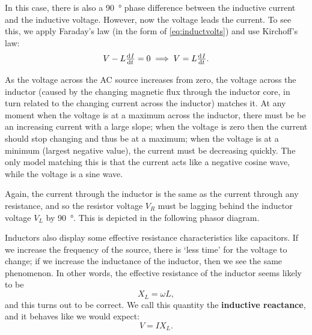 \documentclass[a4paper]{amsbook}
\newcommand{\marginsymbol}{}
\newcommand{\expphasordeg}[4]%
{   \path (#1);
  \pgfgetlastxy{\xorig}{\yorig}
  \pgfmathsetmacro{\xfirst}{\xorig/28.453}
  \pgfmathsetmacro{\yfirst}{\yorig/28.453}
  \pgfmathsetmacro{\xsecond}{\xorig/28.453+#2*cos(#3)}
  \pgfmathsetmacro{\ysecond}{\yorig/28.453+#2*sin(#3)}
  \draw[#4] (\xfirst,\yfirst) -- (\xsecond,\ysecond);
}
\theoremstyle{definition}
\numberwithin{exercise}{chapter}
\numberwithin{exercise}{chapter}
\begin{document}
In this case, there is also a \SI{90}{\degree} phase difference between the inductive current and the inductive voltage. However,
now the voltage leads the current. To see this, we apply Faraday's law (in the form of \cref{eq:inductvolts}) and use
Kirchoff's law:
\begin{displaymath}
  V - L \od{I}{t} = 0 \implies V = L \od{I}{t}.
\end{displaymath}

\marginsymbol As the voltage across the AC source increases from zero, the voltage across the inductor (caused by the changing magnetic flux through
the inductor core, in turn related to the changing current across the inductor) matches it. At any moment when the voltage is at a maximum
across the inductor, there must be be an increasing current with a large slope; when the voltage is zero then the current should stop changing
and thus be at a maximum; when the voltage is at a minimum (largest negative value), the current must be decreasing quickly. The only model
matching this is that the current acts like a negative cosine wave, while the voltage is a sine wave.

Again, the current through the inductor is the same as the current through any resistance, and so the resistor voltage $ V_R $ must be lagging
behind the inductor voltage $ V_L $ by \SI{90}{\degree}. This is depicted in the following phasor diagram.
\begin{center}
\end{center}

Inductors also display some effective resistance characteristics like capacitors. If we increase the frequency of the source, there is `less
time' for the voltage to change; if we increase the inductance of the inductor, then we see the same phenomenon. In other words, the effective
resistance of the inductor seems likely to be
\begin{equation}
  X_L = \omega L,
\end{equation}
and this turns out to be correct. We call this quantity the \textbf{inductive reactance}, and it behaves like we would expect:
\begin{equation}
  V = I X_L.
\end{equation}
\end{document}
